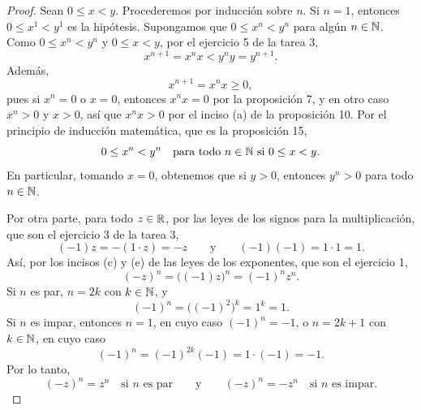 \documentclass[12pt,a4paper]{article}
\begin{document}
    \begin{proof}
        Sean $0\leq x<y$. Procederemos por inducción sobre $n$. Si $n=1$, entonces $0\leq x^{1}<y^{1}$ es la hipótesis. Supongamos que $0\leq x^{n}<y^{n}$ para algún $n\in\mathbb{N}$. Como $0\leq x^{n}<y^{n}$ y $0\leq x<y$, por el ejercicio 5 de la tarea 3,
        \begin{equation*}
            x^{n+1}=x^{n}x<y^{n}y=y^{n+1}.
        \end{equation*}
        Además,
        \begin{equation*}
            x^{n+1}=x^{n}x\geq0,
        \end{equation*}
        pues si $x^{n}=0$ o $x=0$, entonces $x^{n}x=0$ por la proposición 7, y en otro caso $x^{n}>0$ y $x>0$, así que $x^{n}x>0$ por el inciso (a) de la proposición 10. Por el principio de inducción matemática, que es la proposición 15,
        \begin{equation*}
            0\leq x^{n}<y^{n}\quad\text{para todo }n\in\mathbb{N}\text{ si }0\leq x<y.
        \end{equation*}
        En particular, tomando $x=0$, obtenemos que si $y>0$, entonces $y^{n}>0$ para todo $n\in\mathbb{N}$.

        Por otra parte, para todo $z\in\mathbb{R}$, por las leyes de los signos para la multiplicación, que son el ejercicio 3 de la tarea 3, 
        \begin{equation*}
            (-1)z=-(1\cdot z)=-z\qquad\text{y}\qquad(-1)(-1)=1\cdot1=1.
        \end{equation*}
        Así, por los incisos (c) y (e) de las leyes de los exponentes, que son el ejercicio 1,
        \begin{equation*}
            (-z)^{n}=\bigl((-1)z\bigr)^{n}=(-1)^{n}z^{n}.
        \end{equation*}
        Si $n$ es par, $n=2k$ con $k\in\mathbb{N}$, y
        \begin{equation*}
            (-1)^{n}=\bigl((-1)^{2}\bigr)^{k}=1^{k}=1.
        \end{equation*}
        Si $n$ es impar, entonces $n=1$, en cuyo caso $(-1)^{n}=-1$, o $n=2k+1$ con $k\in\mathbb{N}$, en cuyo caso
        \begin{equation*}
            (-1)^{n}=(-1)^{2k}(-1)=1\cdot(-1)=-1.
        \end{equation*}
        Por lo tanto,
        \begin{equation*}
            (-z)^{n}=z^{n}\quad\text{si }n\text{ es par}\qquad\text{y}\qquad(-z)^{n}=-z^{n}\quad\text{si }n\text{ es impar}.
        \end{equation*}


\end{proof}
\end{document}
